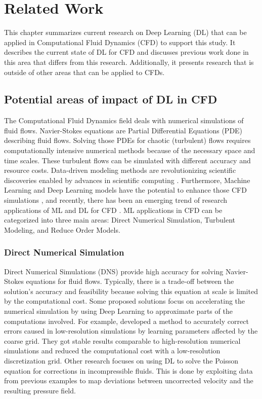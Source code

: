 
\chapter{Related Work}
\label{ch:RelatedWork}
This chapter summarizes current research on Deep Learning (DL) that can be applied in Computational Fluid Dynamics (CFD) to support this study. It describes the current state of DL for CFD and discusses previous work done in this area that differs from this research. Additionally, it presents research that is outside of other areas that can be applied to CFDs.


\section{Potential areas of impact of DL in CFD}
\label{sec:DLinCFD}
The Computational Fluid Dynamics field deals with numerical simulations of fluid flows. Navier-Stokes equations are Partial Differential Equations (PDE) describing fluid flows. Solving those PDEs for chaotic (turbulent) flows requires computationally intensive numerical methods because of the necessary space and time scales. These turbulent flows can be simulated with different accuracy and resource costs. Data-driven modeling methods are revolutionizing scientific discoveries enabled by advances in scientific computing \cite{brunton_data-driven_2022}. Furthermore, Machine Learning and Deep Learning models have the potential to enhance those CFD simulations \cite{vinuesa_enhancing_2022} \cite{brunton_machine_2020}, and recently, there has been an emerging trend of research applications of ML and DL for CFD \cite{vinuesa_emerging_2022}. ML applications in CFD can be categorized into three main areas: Direct Numerical Simulation, Turbulent Modeling, and Reduce Order Models. 

\subsection*{\textbf{Direct Numerical Simulation}}
Direct Numerical Simulations (DNS) provide high accuracy for solving Navier-Stokes equations for fluid flows. Typically, there is a trade-off between the solution's accuracy and feasibility because solving this equation at scale is limited by the computational cost. Some proposed solutions focus on accelerating the numerical simulation by using Deep Learning to approximate parts of the computations involved. For example, \cite{kochkov_machine_2021} developed a method to accurately correct errors caused in low-resolution simulations by learning parameters affected by the coarse grid. They got stable results comparable to high-resolution numerical simulations and reduced the computational cost with a low-resolution discretization grid. Other research \cite{ajuria-illaramendi_towards_2020} \cite{ozbay_poisson_2021} focuses on using DL to solve the Poisson equation for corrections in incompressible fluids. This is done by exploiting data from previous examples to map deviations between uncorrected velocity and the resulting pressure field. 

